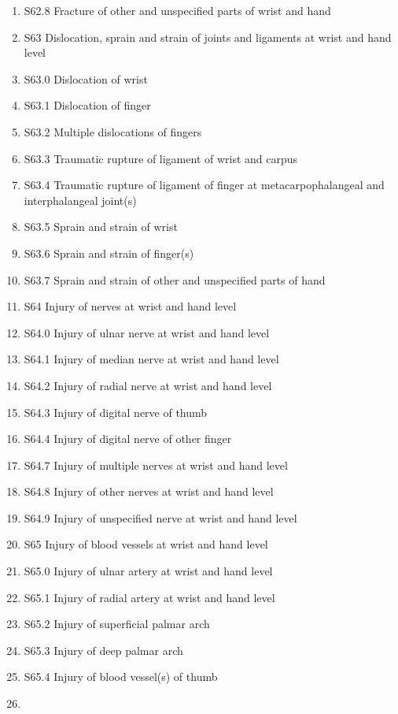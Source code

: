 \documentclass[
]{scrartcl}
\begin{document}
\begin{itemize}
\begin{enumerate}
  \item
    S62.8 Fracture of other and unspecified parts of wrist and hand
  \item
    S63 Dislocation, sprain and strain of joints and ligaments at wrist
    and hand level
  \item
    S63.0 Dislocation of wrist
  \item
    S63.1 Dislocation of finger
  \item
    S63.2 Multiple dislocations of fingers
  \item
    S63.3 Traumatic rupture of ligament of wrist and carpus
  \item
    S63.4 Traumatic rupture of ligament of finger at metacarpophalangeal
    and interphalangeal joint(s)
  \item
    S63.5 Sprain and strain of wrist
  \item
    S63.6 Sprain and strain of finger(s)
  \item
    S63.7 Sprain and strain of other and unspecified parts of hand
  \item
    S64 Injury of nerves at wrist and hand level
  \item
    S64.0 Injury of ulnar nerve at wrist and hand level
  \item
    S64.1 Injury of median nerve at wrist and hand level
  \item
    S64.2 Injury of radial nerve at wrist and hand level
  \item
    S64.3 Injury of digital nerve of thumb
  \item
    S64.4 Injury of digital nerve of other finger
  \item
    S64.7 Injury of multiple nerves at wrist and hand level
  \item
    S64.8 Injury of other nerves at wrist and hand level
  \item
    S64.9 Injury of unspecified nerve at wrist and hand level
  \item
    S65 Injury of blood vessels at wrist and hand level
  \item
    S65.0 Injury of ulnar artery at wrist and hand level
  \item
    S65.1 Injury of radial artery at wrist and hand level
  \item
    S65.2 Injury of superficial palmar arch
  \item
    S65.3 Injury of deep palmar arch
  \item
    S65.4 Injury of blood vessel(s) of thumb
  \item

\end{enumerate}
\end{itemize}
\end{document}
